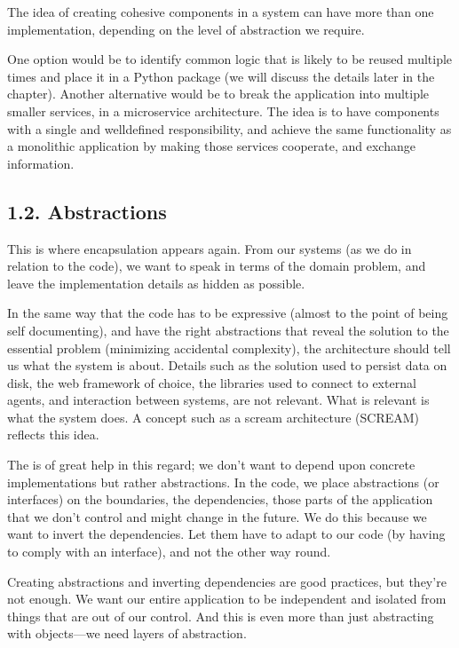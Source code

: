 \documentclass[a4paper,10pt,english]{sphinxmanual}
\begin{document}
The idea of creating cohesive components in a system can have more than one
implementation, depending on the level of abstraction we require.

One option would be to identify common logic that is likely to be reused multiple times
and place it in a Python package (we will discuss the details later in the chapter).
Another alternative would be to break the application into multiple smaller services, in
a microservice architecture. The idea is to have components with a single and well\sphinxhyphen{}defined
responsibility, and achieve the same functionality as a monolithic application by making
those services cooperate, and exchange information.


\subsection{1.2. Abstractions}
\label{\detokenize{chapters/10_clean_architecture/index:abstractions}}
This is where encapsulation appears again. From our systems (as we do in relation to the
code), we want to speak in terms of the domain problem, and leave the implementation
details as hidden as possible.

In the same way that the code has to be expressive (almost to the point of being self\sphinxhyphen{}
documenting), and have the right abstractions that reveal the solution to the essential
problem (minimizing accidental complexity), the architecture should tell us what the
system is about. Details such as the solution used to persist data on disk, the web
framework of choice, the libraries used to connect to external agents, and interaction
between systems, are not relevant. What is relevant is what the system does. A concept
such as a scream architecture (SCREAM) reflects this idea.

The  is of great help in this regard; we don’t want to depend upon
concrete implementations but rather abstractions. In the code, we place abstractions (or interfaces)
on the boundaries, the dependencies, those parts of the application that we don’t control
and might change in the future. We do this because we want to invert the dependencies.
Let them have to adapt to our code (by having to comply with an interface), and not the
other way round.

Creating abstractions and inverting dependencies are good practices, but they’re not
enough. We want our entire application to be independent and isolated from things that are
out of our control. And this is even more than just abstracting with objects—we need layers
of abstraction.
\end{document}
